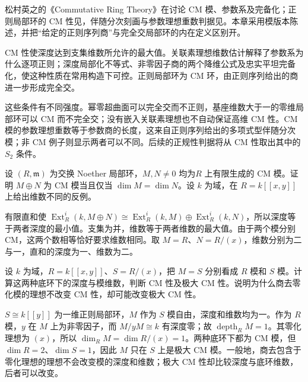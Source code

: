 \ProseParagraphBreak
松村英之的《Commutative Ring Theory》在\cite[Theorems 17.2--17.5, pp. 134--136]{Matsumura1989CommutativeRingTheory}讨论 CM 模、参数系及完备化；正则局部环的 CM 性见\cite[Theorem 17.8, p. 137]{Matsumura1989CommutativeRingTheory}，伴随分次刻画与参数理想重数判据见\cite[Theorems 17.10--17.11, pp. 138--139]{Matsumura1989CommutativeRingTheory}。本章采用模版本陈述，并把“给定的正则序列商”与完全交局部环的内在定义区别开。






\begin{chaptersummary}
	CM 性使深度达到支集维数所允许的最大值。关联素理想维数估计解释了参数系为什么逐项正则；深度局部化不等式、非零因子商的两个降维公式及忠实平坦完备化，使这种性质在常用构造下可控。正则局部环为 CM 环，由正则序列给出的商进一步形成完全交。

	\ProseParagraphBreak
	这些条件有不同强度。幂零超曲面可以完全交而不正则，基座维数大于一的零维局部环可以 CM 而不完全交；没有嵌入关联素理想也不自动保证高维 CM 性。CM 模的参数理想重数等于参数商的长度，这来自正则序列给出的多项式型伴随分次模；非 CM 例子则显示两者可以不同。后续的正规性判据将从 CM 性取出其中的 \(S_2\) 条件。
\end{chaptersummary}

\BookExercises

\begin{exercise}\label{b3:ex:19-direct-sums}
	设 \((R,\mathfrak m)\) 为交换 Noether 局部环，\(M,N\ne0\) 均为\(R\) 上有限生成的 CM 模。证明 \(M\oplus N\) 为 CM 模当且仅当 \(\dim M=\dim N\)。设 \(k\) 为域，在 \(R=k[\![x,y]\!]\) 上给出维数不同的反例。
\end{exercise}
\begin{solution}
	有限直和使 \(\operatorname{Ext}_R^i(k,M\oplus N)\cong\operatorname{Ext}_R^i(k,M)\oplus\operatorname{Ext}_R^i(k,N)\)，所以深度等于两者深度的最小值。支集为并，维数等于两者维数的最大值。由于两个模分别 CM，这两个数相等恰好要求维数相同。取 \(M=R\)、\(N=R/(x)\)，维数分别为二与一，直和的深度为一、维数为二。
\end{solution}

\begin{exercise}\label{b3:ex:19-change-annihilator}
	设 \(k\) 为域，\(R=k[\![x,y]\!]\)、\(S=R/(x)\)，把 \(M=S\) 分别看成 \(R\) 模和 \(S\) 模。计算这两种底环下的深度与模维数，判断 CM 性及极大 CM 性。说明为什么商去零化模的理想不改变 CM 性，却可能改变极大 CM 性。
\end{exercise}
\begin{solution}
	\(S\cong k[\![y]\!]\) 为一维正则局部环，\(M\) 作为 \(S\) 模自由，深度和维数均为一。作为 \(R\) 模，\(y\) 在 \(M\) 上为非零因子，而 \(M/yM\cong k\) 有深度零；故 \(\operatorname{depth}_RM=1\)。其零化理想为 \((x)\)，所以 \(\dim_RM=\dim R/(x)=1\)。两种底环下都为 CM 模，但 \(\dim R=2\)、\(\dim S=1\)，因此 \(M\) 只在 \(S\) 上是极大 CM 模。一般地，商去包含于零化理想的理想不会改变模的深度和维数；极大 CM 性却比较深度与底环维数，后者可以改变。
\end{solution}

